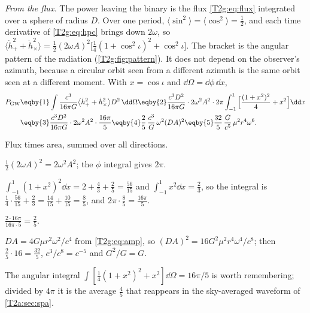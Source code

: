\emph{From the flux.} The power leaving the binary is the flux \eqref{T2g:eq:flux} integrated over a sphere of radius $D$. Over one period, $\langle\sin^2\rangle=\langle\cos^2\rangle=\tfrac12$, and each time derivative of \eqref{T2g:eq:hpc} brings down $2\omega$, so $\langle\dot h_+^2+\dot h_\times^2\rangle=\tfrac12(2\omega A)^2\big[\tfrac14(1+\cos^2\iota)^2+\cos^2\iota\big]$. The bracket is the angular pattern of the radiation (\cref{T2g:fig:pattern}). It does not depend on the observer's azimuth, because a circular orbit seen from a different azimuth is the same orbit seen at a different moment. With $x=\cos\iota$ and $\dd\Omega=\dd\phi\,\dd x$,
\begin{align}
  P_{\rm GW}
  &\eqby{1}\int\frac{c^3}{16\pi G}\big\langle\dot h_+^2+\dot h_\times^2\big\rangle D^2\,\dd\Omega
  \eqby{2}\frac{c^3D^2}{16\pi G}\cdot2\omega^2A^2\cdot2\pi\int_{-1}^{1}\Big[\frac{(1+x^2)^2}{4}+x^2\Big]\dd x\nonumber\\
  &\eqby{3}\frac{c^3D^2}{16\pi G}\cdot2\omega^2A^2\cdot\frac{16\pi}{5}
  \eqby{4}\frac25\,\frac{c^3}{G}\,\omega^2(DA)^2
  \eqby{5}\frac{32}{5}\,\frac{G}{c^5}\,\mu^2r^4\omega^6 .
  \label{T2g:eq:power-binary}
\end{align}
\begin{explain}
  \item Flux times area, summed over all directions.
  \item $\tfrac12(2\omega A)^2=2\omega^2A^2$; the $\phi$ integral gives $2\pi$.
  \item $\int_{-1}^1(1+x^2)^2\dd x=2+\tfrac43+\tfrac25=\tfrac{56}{15}$ and $\int_{-1}^1x^2\dd x=\tfrac23$, so the integral is $\tfrac14\cdot\tfrac{56}{15}+\tfrac23=\tfrac{14}{15}+\tfrac{10}{15}=\tfrac85$, and $2\pi\cdot\tfrac85=\tfrac{16\pi}5$.
  \item $\frac{2\cdot16\pi}{16\pi\cdot5}=\frac25$.
  \item $DA=4G\mu r^2\omega^2/c^4$ from \eqref{T2g:eq:amp}, so $(DA)^2=16G^2\mu^2r^4\omega^4/c^8$; then $\tfrac25\cdot16=\tfrac{32}5$, $c^3/c^8=c^{-5}$ and $G^2/G=G$.
\end{explain}
The angular integral $\int[\tfrac14(1+x^2)^2+x^2]\dd\Omega=16\pi/5$ is worth remembering; divided by $4\pi$ it is the average $\tfrac45$ that reappears in the sky-averaged waveform of \cref{T2a:sec:spa}.

